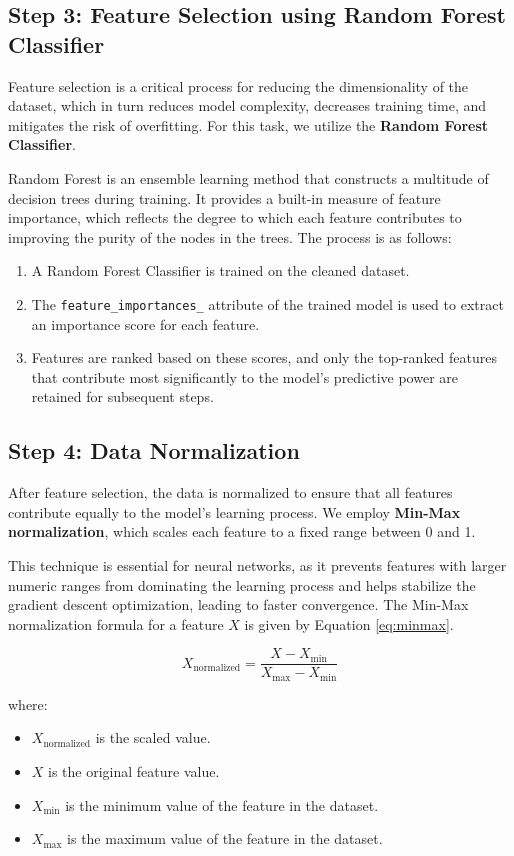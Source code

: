 \documentclass{report}
\begin{document}
\subsection{Step 3: Feature Selection using Random Forest Classifier}
Feature selection is a critical process for reducing the dimensionality of the dataset, which in turn reduces model complexity, decreases training time, and mitigates the risk of overfitting. For this task, we utilize the \textbf{Random Forest Classifier}.

Random Forest is an ensemble learning method that constructs a multitude of decision trees during training. It provides a built-in measure of feature importance, which reflects the degree to which each feature contributes to improving the purity of the nodes in the trees. The process is as follows:
\begin{enumerate}
    \item A Random Forest Classifier is trained on the cleaned dataset.
    \item The \texttt{feature\_importances\_} attribute of the trained model is used to extract an importance score for each feature.
    \item Features are ranked based on these scores, and only the top-ranked features that contribute most significantly to the model's predictive power are retained for subsequent steps.
\end{enumerate}

\subsection{Step 4: Data Normalization}
After feature selection, the data is normalized to ensure that all features contribute equally to the model's learning process. We employ \textbf{Min-Max normalization}, which scales each feature to a fixed range between 0 and 1.

This technique is essential for neural networks, as it prevents features with larger numeric ranges from dominating the learning process and helps stabilize the gradient descent optimization, leading to faster convergence. The Min-Max normalization formula for a feature \(X\) is given by Equation \ref{eq:minmax}.

\begin{equation}
    X_{\text{normalized}} = \frac{X - X_{\min}}{X_{\max} - X_{\min}}
    \label{eq:minmax}
\end{equation}

where:
\begin{itemize}
    \item \(X_{\text{normalized}}\) is the scaled value.
    \item \(X\) is the original feature value.
    \item \(X_{\min}\) is the minimum value of the feature in the dataset.
    \item \(X_{\max}\) is the maximum value of the feature in the dataset.
\end{itemize}
\end{document}
